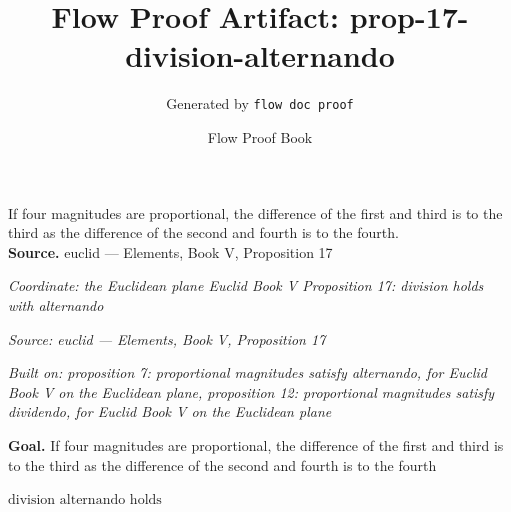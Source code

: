 \documentclass[11pt]{article}
\title{Flow Proof Artifact: prop-17-division-alternando}
\author{Generated by \texttt{flow doc proof}}
\date{Flow Proof Book}
\theoremstyle{definition}
\begin{document}
\maketitle
If four magnitudes are proportional, the difference of the first and third is to the third as the difference of the second and fourth is to the fourth.\\[0.5em]
\textbf{Source.} euclid — Elements, Book V, Proposition 17\\[0.5em]
\bigskip
{}\par
\smallskip\noindent\textit{Coordinate: the Euclidean plane \cdot Euclid Book V \cdot Proposition 17: division holds with alternando}\par
\smallskip\noindent\textit{Source: euclid — Elements, Book V, Proposition 17}\par
\smallskip\noindent\textit{Built on: proposition 7: proportional magnitudes satisfy alternando, for Euclid Book V on the Euclidean plane, proposition 12: proportional magnitudes satisfy dividendo, for Euclid Book V on the Euclidean plane}\par
\medskip
\noindent\textbf{Goal.} If four magnitudes are proportional, the difference of the first and third is to the third as the difference of the second and fourth is to the fourth\par
\noindent$\displaystyle \text{division alternando holds}$\par
\medskip
\noindent
\end{document}
